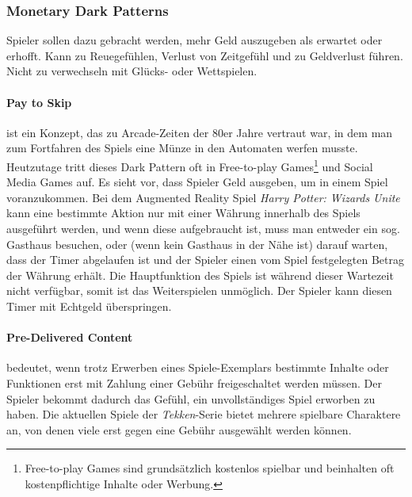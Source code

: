 \documentclass[a4paper]{article}
\begin{document}
\subsubsection{Monetary Dark Patterns}
\label{ssec:monetary_dark_patterns}
Spieler sollen dazu gebracht werden, mehr Geld auszugeben als erwartet oder erhofft. Kann zu Reuegefühlen, Verlust von Zeitgefühl und zu Geldverlust führen.\newline
Nicht zu verwechseln mit Glücks- oder Wettspielen.

\paragraph{Pay to Skip} 
\label{para:pay_to_skip}
ist ein Konzept, das zu Arcade-Zeiten der 80er Jahre vertraut war, in dem man zum Fortfahren des Spiels eine Münze in den Automaten werfen musste. Heutzutage tritt dieses Dark Pattern oft in Free-to-play Games\footnote{\label{foot:10} Free-to-play Games sind grundsätzlich kostenlos spielbar und beinhalten oft kostenpflichtige Inhalte oder Werbung.} und Social Media Games auf. Es sieht vor, dass Spieler Geld ausgeben, um in einem Spiel voranzukommen.\newline
Bei dem Augmented Reality Spiel \textit{Harry Potter: Wizards Unite} kann eine bestimmte Aktion nur mit einer Währung innerhalb des Spiels ausgeführt werden, und wenn diese aufgebraucht ist, muss man entweder ein sog. Gasthaus besuchen, oder (wenn kein Gasthaus in der Nähe ist) darauf warten, dass der Timer abgelaufen ist und der Spieler einen vom Spiel festgelegten Betrag der Währung erhält. Die Hauptfunktion des Spiels ist während dieser Wartezeit nicht verfügbar, somit ist das Weiterspielen unmöglich. Der Spieler kann diesen Timer mit Echtgeld überspringen.

\paragraph{Pre-Delivered Content}
\label{para:pre_delivered_content}
bedeutet, wenn trotz Erwerben eines Spiele-Exemplars bestimmte Inhalte oder Funktionen erst mit Zahlung einer Gebühr freigeschaltet werden müssen. Der Spieler bekommt dadurch das Gefühl, ein unvollständiges Spiel erworben zu haben.\newline
Die aktuellen Spiele der \textit{Tekken}-Serie bietet mehrere spielbare Charaktere an, von denen viele erst gegen eine Gebühr ausgewählt werden können. 
\end{document}
